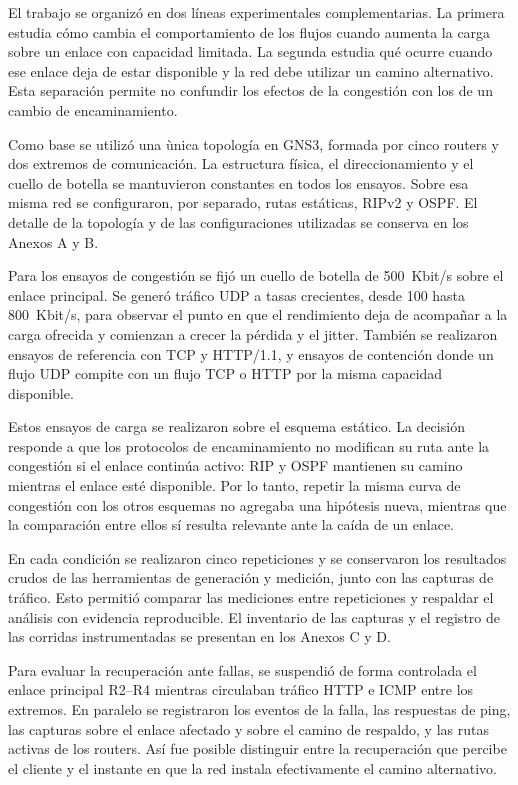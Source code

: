 \documentclass[11pt,a4paper]{article}
\begin{document}
El trabajo se organiz\'o en dos l\'ineas experimentales complementarias. La primera estudia c\'omo cambia el comportamiento de los flujos cuando aumenta la carga sobre un enlace con capacidad limitada. La segunda estudia qu\'e ocurre cuando ese enlace deja de estar disponible y la red debe utilizar un camino alternativo. Esta separaci\'on permite no confundir los efectos de la congesti\'on con los de un cambio de encaminamiento.

Como base se utiliz\'o una \`unica topolog\'ia en GNS3, formada por cinco routers y dos extremos de comunicaci\'on. La estructura f\'isica, el direccionamiento y el cuello de botella se mantuvieron constantes en todos los ensayos. Sobre esa misma red se configuraron, por separado, rutas est\'aticas, RIPv2 y OSPF. El detalle de la topolog\'ia y de las configuraciones utilizadas se conserva en los Anexos A y B.

Para los ensayos de congesti\'on se fij\'o un cuello de botella de 500~Kbit/s sobre el enlace principal. Se gener\'o tr\'afico UDP a tasas crecientes, desde 100 hasta 800~Kbit/s, para observar el punto en que el rendimiento deja de acompa\~nar a la carga ofrecida y comienzan a crecer la p\'erdida y el jitter. Tambi\'en se realizaron ensayos de referencia con TCP y HTTP/1.1, y ensayos de contenci\'on donde un flujo UDP compite con un flujo TCP o HTTP por la misma capacidad disponible.

Estos ensayos de carga se realizaron sobre el esquema est\'atico. La decisi\'on responde a que los protocolos de encaminamiento no modifican su ruta ante la congesti\'on si el enlace contin\'ua activo: RIP y OSPF mantienen su camino mientras el enlace est\'e disponible. Por lo tanto, repetir la misma curva de congesti\'on con los otros esquemas no agregaba una hip\'otesis nueva, mientras que la comparaci\'on entre ellos s\'i resulta relevante ante la ca\'ida de un enlace.

En cada condici\'on se realizaron cinco repeticiones y se conservaron los resultados crudos de las herramientas de generaci\'on y medici\'on, junto con las capturas de tr\'afico. Esto permiti\'o comparar las mediciones entre repeticiones y respaldar el an\'alisis con evidencia reproducible. El inventario de las capturas y el registro de las corridas instrumentadas se presentan en los Anexos C y D.

Para evaluar la recuperaci\'on ante fallas, se suspendi\'o de forma controlada el enlace principal R2--R4 mientras circulaban tr\'afico HTTP e ICMP entre los extremos. En paralelo se registraron los eventos de la falla, las respuestas de ping, las capturas sobre el enlace afectado y sobre el camino de respaldo, y las rutas activas de los routers. As\'i fue posible distinguir entre la recuperaci\'on que percibe el cliente y el instante en que la red instala efectivamente el camino alternativo.
\end{document}
